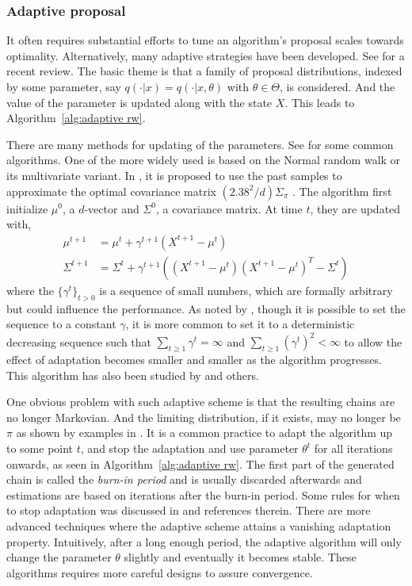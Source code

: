 \subsubsection{Adaptive proposal}
\label{ssub:Adaptive proposal}

It often requires substantial efforts to tune an algorithm's proposal scales
towards optimality. Alternatively, many adaptive strategies have been
developed. See \cite{Andrieu:2008kh} for a recent review. The basic theme is
that a family of proposal distributions, indexed by some parameter, say
$q(\cdot|x) = q(\cdot|x, \theta)$ with $\theta\in\Theta$, is considered. And
the value of the parameter is updated along with the state $X$. This leads to
Algorithm~\ref{alg:adaptive rw}.



There are many methods for updating of the parameters. See
\cite{Andrieu:2008kh} for some common algorithms. One of the more widely used
is based on the Normal random walk or its multivariate variant. In
\cite{Haario:1999dh,Haario:2001gu}, it is proposed to use the past samples to
approximate the optimal covariance matrix $(2.38^2/d)\Sigma_{\pi}$
\cite{Gelman:1995vx}. The algorithm first initialize $\mu^0$, a $d$-vector and
$\Sigma^0$, a covariance matrix. At time $t$, they are updated with,
\begin{align}
  \mu^{t+1} &= \mu^t + \gamma^{t+1} (X^{t+1} - \mu^t) \\
  \Sigma^{t+1} &= \Sigma^t + \gamma^{t+1}((X^{t+1} - \mu^t)(X^{t+1} - \mu^t)^T
  - \Sigma^t)
\end{align}
where the $\{\gamma^t\}_{t>0}$ is a sequence of small numbers, which are
formally arbitrary but could influence the performance. As noted by
\cite{Andrieu:2008kh}, though it is possible to set the sequence to a constant
$\gamma$, it is more common to set it to a deterministic decreasing sequence
such that $\sum_{t\ge1}\gamma^t = \infty$ and
$\sum_{t\ge1}(\gamma^t)^2<\infty$ to allow the effect of adaptation becomes
smaller and smaller as the algorithm progresses. This algorithm has also been
studied by \cite{Andrieu:2006tw} and others.

One obvious problem with such adaptive scheme is that the resulting chains are
no longer Markovian. And the limiting distribution, if it exists, may no
longer be $\pi$ as shown by examples in \cite{Andrieu:2008kh}. It is a common
practice to adapt the algorithm up to some point $t$, and stop the adaptation
and use parameter $\theta^t$ for all iterations onwards, as seen in
Algorithm~\ref{alg:adaptive rw}. The first part of the generated chain is
called the \emph{burn-in period} and is usually discarded afterwards and
estimations are based on iterations after the burn-in period. Some rules
for when to stop adaptation was discussed in \cite{Andrieu:2008kh} and
references therein. There are more advanced techniques where the adaptive
scheme attains a vanishing adaptation property. Intuitively, after a long
enough period, the adaptive algorithm will only change the parameter $\theta$
slightly and eventually it becomes stable. These algorithms requires more
careful designs to assure convergence.

